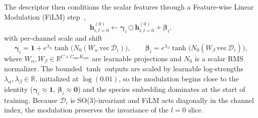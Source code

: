 The descriptor then conditions the scalar features through a
Feature-wise Linear Modulation (FiLM) step~\cite{perez2018film},
\begin{equation}
    \mathbf{h}_{i,l=0}^{(0)}
    \leftarrow
    \boldsymbol{\gamma}_i \odot \mathbf{h}_{i,l=0}^{(0)} + \boldsymbol{\beta}_i,
    \label{eq:dpa4-film}
\end{equation}
with per-channel scale and shift
\begin{equation}
    \boldsymbol{\gamma}_i = \mathbf{1} + e^{\lambda_\alpha}\tanh\!\bigl(N_0(W_\alpha\,\mathrm{vec}\,\mathcal{D}_i)\bigr),
    \qquad
    \boldsymbol{\beta}_i = e^{\lambda_\beta}\tanh\!\bigl(N_0(W_\beta\,\mathrm{vec}\,\mathcal{D}_i)\bigr),
    \label{eq:dpa4-film-gb}
\end{equation}
where $W_\alpha,W_\beta\in\mathbb{R}^{C\times C_{\mathrm{env}}
        K_{\mathrm{env}}}$ are learnable projections and $N_0$ is a scalar RMS normalizer.
The bounded $\tanh$ outputs are scaled by learnable log-strengths $\lambda_\alpha,\lambda_\beta\in\mathbb{R}$, initialized at $\log(0.01)$, so the modulation begins close to the identity ($\boldsymbol{\gamma}_i\approx\mathbf{1}$, $\boldsymbol{\beta}_i\approx\mathbf{0}$) and the species embedding dominates at the start of training.
Because $\mathcal{D}_i$ is SO(3)-invariant and FiLM acts diagonally in the channel index, the modulation preserves the invariance of the $l=0$ slice.

